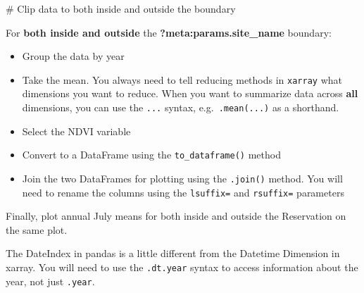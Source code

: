 \documentclass[
  letterpaper,
  DIV=11,
  numbers=noendperiod,
  oneside]{scrreprt}
\newenvironment{Shaded}{\begin{snugshade}}{\end{snugshade}}
\newcommand{\CommentTok}[1]{\textcolor[rgb]{0.37,0.37,0.37}{#1}}
\providecommand{\tightlist}{%
  \setlength{\itemsep}{0pt}\setlength{\parskip}{0pt}}
\begin{document}
\begin{Shaded}
\begin{Highlighting}[]
\CommentTok{\# Clip data to both inside and outside the boundary}
\end{Highlighting}
\end{Shaded}

\begin{tcolorbox}[enhanced jigsaw, colbacktitle=quarto-callout-color!10!white, opacityback=0, bottomtitle=1mm, toptitle=1mm, bottomrule=.15mm, left=2mm, colframe=quarto-callout-color-frame, leftrule=.75mm, opacitybacktitle=0.6, colback=white, rightrule=.15mm, toprule=.15mm, breakable, titlerule=0mm, title=\textcolor{quarto-callout-color}{\faInfo}\hspace{0.5em}{Try It}, coltitle=black, arc=.35mm]

For \textbf{both inside and outside} the
\textbf{?meta:params.site\_name} boundary:

\begin{itemize}
\tightlist
\item
  Group the data by year
\item
  Take the mean. You always need to tell reducing methods in
  \texttt{xarray} what dimensions you want to reduce. When you want to
  summarize data across \textbf{all} dimensions, you can use the
  \texttt{...} syntax, e.g.~\texttt{.mean(...)} as a shorthand.
\item
  Select the NDVI variable
\item
  Convert to a DataFrame using the \texttt{to\_dataframe()} method
\item
  Join the two DataFrames for plotting using the \texttt{.join()}
  method. You will need to rename the columns using the
  \texttt{lsuffix=} and \texttt{rsuffix=} parameters
\end{itemize}

Finally, plot annual July means for both inside and outside the
Reservation on the same plot.

\end{tcolorbox}

\begin{tcolorbox}[enhanced jigsaw, colbacktitle=quarto-callout-caution-color!10!white, opacityback=0, bottomtitle=1mm, toptitle=1mm, bottomrule=.15mm, left=2mm, colframe=quarto-callout-caution-color-frame, leftrule=.75mm, opacitybacktitle=0.6, colback=white, rightrule=.15mm, toprule=.15mm, breakable, titlerule=0mm, title=\textcolor{quarto-callout-caution-color}{\faFire}\hspace{0.5em}{GOTCHA ALERT}, coltitle=black, arc=.35mm]

The DateIndex in pandas is a little different from the Datetime
Dimension in xarray. You will need to use the \texttt{.dt.year} syntax
to access information about the year, not just \texttt{.year}.

\end{tcolorbox}
\end{document}
